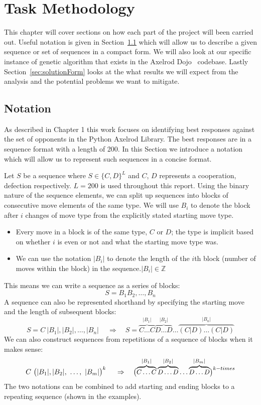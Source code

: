 
\chapter{Task Methodology}\label{ch:taskBackground}
This chapter will cover sections on how each part of the project will been carried out.
Useful notation is given in Section~\ref{sec:notation} which will allow us to describe a given sequence or set of sequences in a compact form.
We will also look at our specific instance of genetic algorithm that exists in the Axelrod Dojo~\cite{dojoV008} codebase.
Lastly Section~\ref{sec:solutionForm} looks at the what results we will expect from the analysis and the potential problems we want to mitigate.

\section{Notation}\label{sec:notation}
As described in Chapter 1 this work focuses on identifying best responses against the set of opponents in the Python Axelrod Library. The best responses are in a sequence format with a length of 200. In this Section we introduce a notation which will allow us to represent such sequences in a concise format.

Let $S$ be a sequence where \(S\in\{C, D\}^L\) and \(C\), \(D\) represents a cooperation, defection respectively.
\(L=200\) is used throughout this report.
Using the binary nature of the sequence elements, we can split up sequences into blocks of consecutive move elements of the same type.
We will use \(B_i\) to denote the block after \(i\) changes of move type from the explicitly stated starting move type.
\begin{itemize}
    \item Every move in a block is of the same type, $C$ or $D$;
    the type is implicit based on whether \(i\) is even or not and what the starting move type was.
    \item We can use the notation \(|B_i|\) to denote the length of the \(i\)th block (number of moves within the block) in the sequence.\(|B_i| \in \mathbb{Z}\)
\end{itemize}

This means we can write a sequence as a series of blocks:
\[S= B_1 B_2,\ldots,B_n\]
A sequence can also be represented shorthand by specifying the starting move and the length of subsequent blocks:
\[S = C\ |B_1|,|B_2|,\ldots,|B_n|\ \quad \Rightarrow \quad S=\overbrace{C\ldots C}^{|B_1|}\overbrace{D\ldots D}^{|B_2|}\ldots\overbrace{(C|D)\ldots (C|D)}^{|B_n|} \]
We can also construct sequences from repetitions of a sequence of blocks when it makes sense:
\[C\ \big{(}|B_1|,|B_2|,\ \ldots,\ |B_m|\big{)}^{k}\ \quad \Rightarrow \quad \big{(}\small{\overbrace{C\ldots C}^{|B_1|}\overbrace{D\ldots D}^{|B_2|}\ldots\overbrace{D\ldots D}^{|B_m|}}\big{)}^{k-times}\]
The two notations can be combined to add starting and ending blocks to a repeating sequence (shown in the examples).

